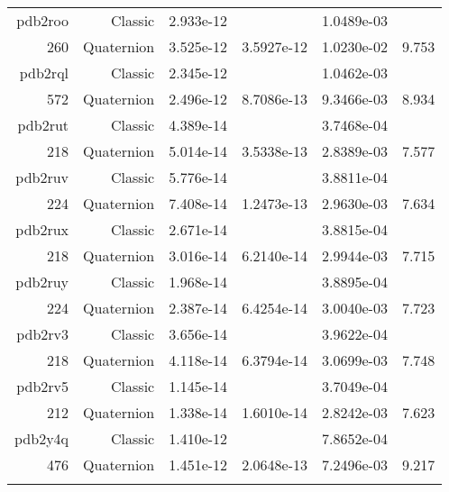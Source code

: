 \begin{xltabular}{\textwidth}{r|rS[table-format=1.3e+2]S[table-format=1.4e+2]S[table-format=1.4e+2]S[table-format=-1.3]}
pdb2roo & Classic & 2.933e-12 &  & 1.0489e-03 & \\
260 & Quaternion & 3.525e-12 & 3.5927e-12 & 1.0230e-02 & 9.753\\  \addlinespace
pdb2rql & Classic & 2.345e-12 &  & 1.0462e-03 & \\
572 & Quaternion & 2.496e-12 & 8.7086e-13 & 9.3466e-03 & 8.934\\  \addlinespace
pdb2rut & Classic & 4.389e-14 &  & 3.7468e-04 & \\
218 & Quaternion & 5.014e-14 & 3.5338e-13 & 2.8389e-03 & 7.577\\  \addlinespace
pdb2ruv & Classic & 5.776e-14 &  & 3.8811e-04 & \\
224 & Quaternion & 7.408e-14 & 1.2473e-13 & 2.9630e-03 & 7.634\\  \addlinespace
pdb2rux & Classic & 2.671e-14 &  & 3.8815e-04 & \\
218 & Quaternion & 3.016e-14 & 6.2140e-14 & 2.9944e-03 & 7.715\\  \addlinespace
pdb2ruy & Classic & 1.968e-14 &  & 3.8895e-04 & \\
224 & Quaternion & 2.387e-14 & 6.4254e-14 & 3.0040e-03 & 7.723\\  \addlinespace
pdb2rv3 & Classic & 3.656e-14 &  & 3.9622e-04 & \\
218 & Quaternion & 4.118e-14 & 6.3794e-14 & 3.0699e-03 & 7.748\\  \addlinespace
pdb2rv5 & Classic & 1.145e-14 &  & 3.7049e-04 & \\
212 & Quaternion & 1.338e-14 & 1.6010e-14 & 2.8242e-03 & 7.623\\  \addlinespace
pdb2y4q & Classic & 1.410e-12 &  & 7.8652e-04 & \\
476 & Quaternion & 1.451e-12 & 2.0648e-13 & 7.2496e-03 & 9.217\\  \addlinespace
\end{xltabular}
